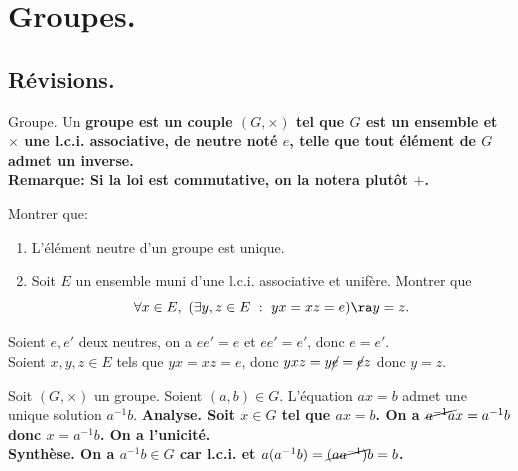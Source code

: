\documentclass[11pt]{article}
\begin{document}


\thispagestyle{fancy}

\section{Groupes.}

\subsection{Révisions.}

\begin{defi}{Groupe.}{}
    Un \bf{groupe} est un couple $(G,\times)$ tel que $G$ est un ensemble et $\times$ une l.c.i. associative, de neutre noté $e$, telle que tout élément de $G$ admet un inverse.\\
    \bf{Remarque:} Si la loi est commutative, on la notera plutôt $+$.
\end{defi}

\vspace*{-0.7cm}

\begin{ex}{}{}
    Montrer que:
    \begin{enumerate}
        \item L'élément neutre d'un groupe est unique.
        \item Soit $E$ un ensemble muni d'une l.c.i. associative et unifère. Montrer que
        \begin{equation*}
            \forall x \in E, ~ (\exists y,z \in E ~ : ~ yx = xz = e) \ra y = z.
        \end{equation*}
    \end{enumerate}
    \tcblower
     Soient $e,e'$ deux neutres, on a $ee'=e$ et $ee'=e'$, donc $e=e'$.\\
     Soient $x,y,z\in E$ tels que $yx=xz=e$, donc $yxz=y\cancel{e}=\cancel{e}z$ donc $y=z$.
\end{ex}

\vspace*{-0.7cm}

\begin{prop}{}{}
    Soit $(G,\times)$ un groupe. Soient $(a,b)\in G$. L'équation $ax=b$ admet une unique solution $a^{-1}b$.
    \tcblower
    \bf{Analyse.} Soit $x\in G$ tel que $ax=b$. On a $\cancel{a^{-1}a}x=a^{-1}b$ donc $x=a^{-1}b$. On a l'unicité.\\
    \bf{Synthèse.} On a $a^{-1}b\in G$ car l.c.i. et $a(a^{-1}b)=\cancel{(aa^{-1})}b=b$.
\end{prop}
\end{document}
